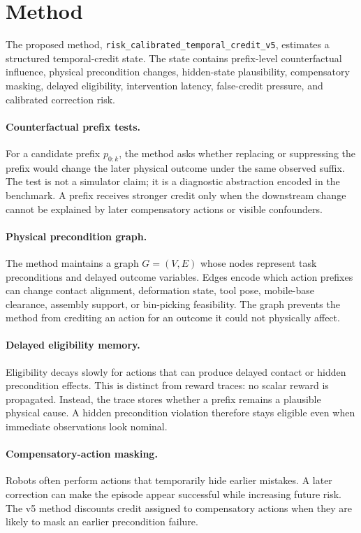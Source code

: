 \documentclass{article}
\begin{document}
\section{Method}
The proposed method, \texttt{risk\_calibrated\_temporal\_credit\_v5}, estimates a structured temporal-credit state. The state contains prefix-level counterfactual influence, physical precondition changes, hidden-state plausibility, compensatory masking, delayed eligibility, intervention latency, false-credit pressure, and calibrated correction risk.

\paragraph{Counterfactual prefix tests.}
For a candidate prefix $p_{0:k}$, the method asks whether replacing or suppressing the prefix would change the later physical outcome under the same observed suffix. The test is not a simulator claim; it is a diagnostic abstraction encoded in the benchmark. A prefix receives stronger credit only when the downstream change cannot be explained by later compensatory actions or visible confounders.

\paragraph{Physical precondition graph.}
The method maintains a graph $G=(V,E)$ whose nodes represent task preconditions and delayed outcome variables. Edges encode which action prefixes can change contact alignment, deformation state, tool pose, mobile-base clearance, assembly support, or bin-picking feasibility. The graph prevents the method from crediting an action for an outcome it could not physically affect.

\paragraph{Delayed eligibility memory.}
Eligibility decays slowly for actions that can produce delayed contact or hidden precondition effects. This is distinct from reward traces: no scalar reward is propagated. Instead, the trace stores whether a prefix remains a plausible physical cause. A hidden precondition violation therefore stays eligible even when immediate observations look nominal.

\paragraph{Compensatory-action masking.}
Robots often perform actions that temporarily hide earlier mistakes. A later correction can make the episode appear successful while increasing future risk. The v5 method discounts credit assigned to compensatory actions when they are likely to mask an earlier precondition failure.
\end{document}
